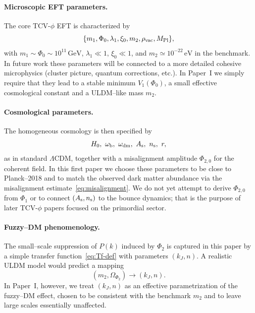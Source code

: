 \documentclass[aps,prd,onecolumn,nofootinbib,superscriptaddress]{revtex4-2}
\newcommand{\Mpl}{M_{\rm Pl}}
\newcommand{\As}{A_{\rm s}}
\newcommand{\ns}{n_{\rm s}}
\begin{document}
\paragraph*{Microscopic EFT parameters.}
The core TCV-$\phi$ EFT is characterized by
\begin{equation}
  \{m_1,\Phi_0,\lambda_1,\xi_0,m_2,\rho_{\rm vac},\Mpl\},
\end{equation}
with $m_1\sim\Phi_0\sim 10^{11}\,\mathrm{GeV}$, $\lambda_1\ll 1$, $\xi_0\ll1$, and $m_2\simeq 10^{-22}\,\mathrm{eV}$ in the benchmark.
In future work these parameters will be connected to a more detailed cohesive microphysics (cluster picture, quantum corrections, etc.).
In Paper~I we simply require that they lead to a stable minimum $V_1(\Phi_0)$, a small effective cosmological constant and a ULDM--like mass $m_2$.

\paragraph*{Cosmological parameters.}
The homogeneous cosmology is then specified by
\begin{equation}
  H_0,\ \omega_{\rm b},\ \omega_{\rm dm},\ \As,\ \ns,\ r,
\end{equation}
as in standard $\Lambda$CDM, together with a misalignment amplitude $\Phi_{2,0}$ for the coherent field.
In this first paper we choose these parameters to be close to Planck--2018 and to match the observed dark matter abundance via the misalignment estimate~\eqref{eq:misalignment}.
We do not yet attempt to derive $\Phi_{2,0}$ from $\Phi_1$ or to connect $(\As,\ns)$ to the bounce dynamics; that is the purpose of later TCV-$\phi$ papers focused on the primordial sector.

\paragraph*{Fuzzy--DM phenomenology.}
The small--scale suppression of $P(k)$ induced by $\Phi_2$ is captured in this paper by a simple transfer function~\eqref{eq:Tf-def} with parameters $(k_J,n)$.
A realistic ULDM model would predict a mapping
\begin{equation}
  (m_2,\Omega_{\Phi_2}) \longrightarrow (k_J,n).
\end{equation}
In Paper~I, however, we treat $(k_J,n)$ as an effective parametrization of the fuzzy--DM effect, chosen to be consistent with the benchmark $m_2$ and to leave large scales essentially unaffected.
\end{document}
